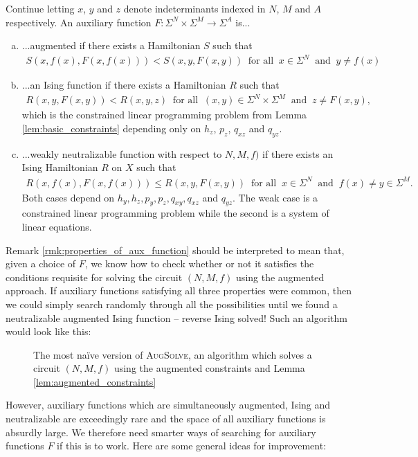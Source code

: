 \documentclass{article}
\begin{document}
\begin{rmk}\label{rmk:properties_of_aux_function}
  Continue letting $x$, $y$ and $z$ denote indeterminants indexed in $N$, $M$ and $A$ respectively. An auxiliary function $F:\Sigma^N \times \Sigma^M \to \Sigma^A$ is...
  \begin{enumerate}[(a)]
    \item ...augmented if there exists a Hamiltonian $S$ such that
      \begin{align*}
        S(x,f(x),F(x,f(x))) < S(x,y,F(x,y)) ~ \text{ for all }~ x \in \Sigma^N ~\text{ and } ~ y\neq f(x)
      \end{align*}
    \item ...an Ising function if there exists a Hamiltonian $R$ such that
      \begin{align*}
        R(x,y,F(x,y)) < R(x,y,z) ~\text{ for all }~ (x,y) \in \Sigma^N\times \Sigma^M ~\text{ and }~ z \neq F(x,y),
      \end{align*}
      which is the constrained linear programming problem from Lemma \ref{lem:basic_constraints} depending only on $h_z$, $p_z$, $q_{xz}$ and $q_{yz}$.
    \item ...weakly neutralizable function with respect to $N,M,f)$ if there exists an Ising Hamiltonian $R$ on $X$ such that
      \begin{align*}
        R(x,f(x), F(x,f(x))) \leq R(x,y,F(x,y)) ~\text{ for all }~ x \in \Sigma^N ~ \text{ and } ~ f(x) \neq y \in \Sigma^M.
      \end{align*}
      Both cases depend on $h_y, h_z, p_y, p_z, q_{xy}, q_{xz}$ and $q_{yz}$. The weak case is a constrained linear programming problem while the second is a system of linear equations.
  \end{enumerate}
\end{rmk}

Remark \ref{rmk:properties_of_aux_function} should be interpreted to mean that, given a choice of $F$, we know how to check whether or not it satisfies the conditions requisite for solving the circuit $(N,M,f)$ using the augmented approach. If auxiliary functions satisfying all three properties were common, then we could simply search randomly through all the possibilities until we found a neutralizable augmented Ising function -- reverse Ising solved! Such an algorithm would look like this:

\begin{figure}
  \centering
  
  \caption{The most na\"ive version of \textsc{AugSolve}, an algorithm which solves a circuit $(N,M,f)$ using the augmented constraints and Lemma \ref{lem:augmented_constraints}}\label{fig:augmented_solve_flowchart}
\end{figure}
However, auxiliary functions which are simultaneously augmented, Ising and neutralizable are exceedingly rare and the space of all auxiliary functions is absurdly large. We therefore need smarter ways of searching for auxiliary functions $F$ if this is to work. Here are some general ideas for improvement:
\end{document}
